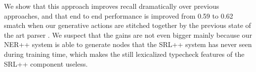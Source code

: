 \documentclass[11pt]{article}
\begin{document}
We show that this approach improves recall dramatically over previous approaches, and that end to end performance is improved from 0.59 to 0.62 smatch when our generative actions are stitched together by the previous state of the art parser \cite{2014flanigan-amr}.
We suspect that the gains are not even bigger mainly because our NER++ system is able to generate nodes that the SRL++ system has never seen during training time, which makes the still lexicalized typecheck features of the SRL++ component useless.






\end{document}
